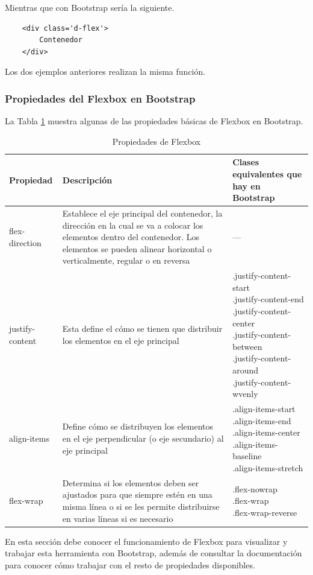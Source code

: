 Mientras que con Bootstrap sería la siguiente.
\begin{lstlisting}
    <div class='d-flex'>
        Contenedor
    </div>
\end{lstlisting}

Los dos ejemplos anteriores realizan la misma función.


\subsubsection{Propiedades del Flexbox en Bootstrap}

La Tabla \ref{tab:2} muestra algunas de las propiedades básicas de Flexbox en Bootstrap.
\begin{table}[H]
    \centering
    \caption{Propiedades de Flexbox}
    \label{tab:2}
    \begin{tabular}{m{3cm} m{5cm} m{5cm}}
        \hline
        \textbf{Propiedad} & \textbf{Descripción} & \textbf{Clases equivalentes que hay en Bootstrap} \\
        \hline
        flex-direction  & \parbox{5cm}{Establece el eje principal del contenedor, la dirección en la cual se va a colocar los elementos dentro del contenedor. Los elementos se pueden alinear horizontal o verticalmente, regular o en reversa}         & --- \\
        \hline
        justify-content & \parbox{5cm}{\raggedright Esta define el cómo se tienen que distribuir los elementos en el eje principal}            & \parbox{5cm}{\raggedright.justify-content-start \\ .justify-content-end \\ .justify-content-center \\ .justify-content-between \\ .justify-content-around \\ .justify-content-wvenly \\ } \\
        \hline
        align-items     & \parbox{5cm}{\raggedright Define cómo se distribuyen los elementos en el eje perpendicular (o eje secundario) al eje principal}            & \parbox{5cm}{\raggedright.align-items-start \\ .align-items-end \\ .align-items-center \\ .align-items-baseline \\ .align-items-stretch} \\
        \hline
        flex-wrap       & \parbox{5cm}{\raggedright Determina si los elementos deben ser ajustados para que siempre estén en una misma línea o si se les permite distribuirse en varias líneas si es necesario}          & \parbox{5cm}{\raggedright.flex-nowrap \\ .flex-wrap \\ .flex-wrap-reverse} \\
        \hline
    \end{tabular}
\end{table}

En esta sección debe conocer el funcionamiento de Flexbox para visualizar y trabajar esta herramienta con Bootstrap, además de consultar la documentación para conocer cómo trabajar con el resto de propiedades disponibles.